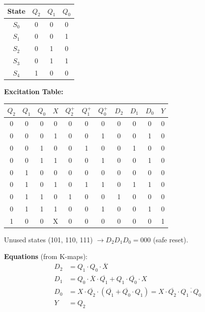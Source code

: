 \documentclass[12pt,a4paper]{article}
\begin{document}
\begin{table}[H]
\centering
\begin{tabular}{c|ccc}
\toprule
State & $Q_2$ & $Q_1$ & $Q_0$ \\
\midrule
$S_0$ & 0 & 0 & 0 \\
$S_1$ & 0 & 0 & 1 \\
$S_2$ & 0 & 1 & 0 \\
$S_3$ & 0 & 1 & 1 \\
$S_4$ & 1 & 0 & 0 \\
\bottomrule
\end{tabular}
\end{table}

\textbf{Excitation Table:}

\begin{table}[H]
\centering
\footnotesize
\begin{tabular}{cccc|ccc|ccc|c}
\toprule
$Q_2$ & $Q_1$ & $Q_0$ & $X$ & $Q_2^+$ & $Q_1^+$ & $Q_0^+$ & $D_2$ & $D_1$ & $D_0$ & $Y$ \\
\midrule
0 & 0 & 0 & 0 & 0 & 0 & 0 & 0 & 0 & 0 & 0 \\
0 & 0 & 0 & 1 & 0 & 0 & 1 & 0 & 0 & 1 & 0 \\
0 & 0 & 1 & 0 & 0 & 1 & 0 & 0 & 1 & 0 & 0 \\
0 & 0 & 1 & 1 & 0 & 0 & 1 & 0 & 0 & 1 & 0 \\
0 & 1 & 0 & 0 & 0 & 0 & 0 & 0 & 0 & 0 & 0 \\
0 & 1 & 0 & 1 & 0 & 1 & 1 & 0 & 1 & 1 & 0 \\
0 & 1 & 1 & 0 & 1 & 0 & 0 & 1 & 0 & 0 & 0 \\
0 & 1 & 1 & 1 & 0 & 0 & 1 & 0 & 0 & 1 & 0 \\
1 & 0 & 0 & X & 0 & 0 & 0 & 0 & 0 & 0 & 1 \\
\bottomrule
\end{tabular}
\end{table}

Unused states (101, 110, 111) $\to D_2 D_1 D_0 = 000$ (safe reset).

\textbf{Equations} (from K-maps):
\begin{align}
D_2 &= Q_1 \cdot Q_0 \cdot \overline{X} \\
D_1 &= Q_0 \cdot \overline{X} \cdot \overline{Q_1} + Q_1 \cdot \overline{Q_0} \cdot X \\
D_0 &= X \cdot \overline{Q_2} \cdot (\overline{Q_1} + \overline{Q_0} \cdot Q_1) = X \cdot \overline{Q_2} \cdot \overline{Q_1 \cdot Q_0}\\
Y &= Q_2
\end{align}
\end{document}
